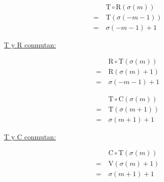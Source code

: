 		\begin{multicols}{3}
			\begin{align*}
			&\ \mbox{T}\circ\mbox{R}(\sigma(m))\\
			=&\ \mbox{T}(\sigma(-m-1))\\
			=&\ \sigma(-m-1)+1
			\end{align*}
			
			\underline{T y R conmutan:}
			
			\begin{align*}
			&\ \mbox{R}\circ\mbox{T}(\sigma(m))\\
			=&\ \mbox{R}(\sigma(m)+1)\\
			=&\ \sigma(-m-1)+1
			\end{align*}
		\end{multicols}
	
		\begin{multicols}{3}
			\begin{align*}
			&\ \mbox{T}\circ\mbox{C}(\sigma(m))\\
			=&\ \mbox{T}(\sigma(m+1))\\
			=&\ \sigma(m+1)+1
			\end{align*}
			
			\underline{T y C conmutan:}
			
			\begin{align*}
			&\ \mbox{C}\circ\mbox{T}(\sigma(m))\\
			=&\ \mbox{V}(\sigma(m)+1)\\
			=&\ \sigma(m+1)+1
			\end{align*}
		\end{multicols}
